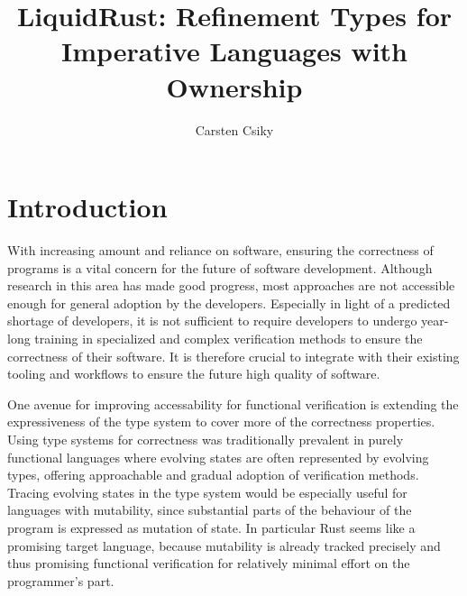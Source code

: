 \documentclass[twoside, english, final]{sdqthesis}
\author{Carsten Csiky}
\title{LiquidRust: Refinement Types for Imperative Languages with Ownership}
\theoremstyle{definition}
\begin{document}
\setpdf

\maketitle

\frontmatter



\setcounter{page}{1}

 


\tableofcontents

\listoffigures
\listoftables
\listoflistings


\mainmatter

\iftrue %
\chapter{Introduction}


With increasing amount and reliance on software, ensuring the correctness of programs is a vital concern for the future of software development.
Although research in this area has made good progress, most approaches are not accessible enough for general adoption by the developers. Especially in light of a predicted shortage of developers\cite{breaux_2021_2021-1}, it is not sufficient to require developers to undergo year-long training in specialized and complex verification methods to ensure the correctness of their software. It is therefore crucial to integrate with their existing tooling and workflows to ensure the future high quality of software.

One avenue for improving accessability for functional verification is extending the expressiveness of the type system to cover more of the correctness properties.
Using type systems for correctness was traditionally prevalent in purely functional languages where evolving states are often represented by evolving types, offering approachable and gradual adoption of verification methods. Tracing evolving states in the type system would be especially useful for languages with mutability, since substantial parts of the behaviour of the program is expressed as mutation of state. In particular Rust seems like a promising target language, because mutability is already tracked precisely and thus promising functional verification for relatively minimal effort on the programmer's part.
\end{document}
